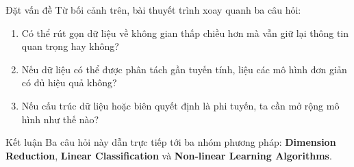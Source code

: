 \begin{frame}{Đặt vấn đề}
    Từ bối cảnh trên, bài thuyết trình xoay quanh ba câu hỏi:

    \vspace{0.15cm}
    \begin{enumerate}
        \item Có thể rút gọn dữ liệu về không gian thấp chiều hơn mà vẫn giữ lại thông tin quan trọng hay không?
        \item Nếu dữ liệu có thể được phân tách gần tuyến tính, liệu các mô hình đơn giản có đủ hiệu quả không?
        \item Nếu cấu trúc dữ liệu hoặc biên quyết định là phi tuyến, ta cần mở rộng mô hình như thế nào?
    \end{enumerate}

    \vspace{0.15cm}
    \begin{block}{Kết luận}
        Ba câu hỏi này dẫn trực tiếp tới ba nhóm phương pháp:
        \textbf{Dimension Reduction}, \textbf{Linear Classification} và
        \textbf{Non-linear Learning Algorithms}.
    \end{block}
\end{frame}

